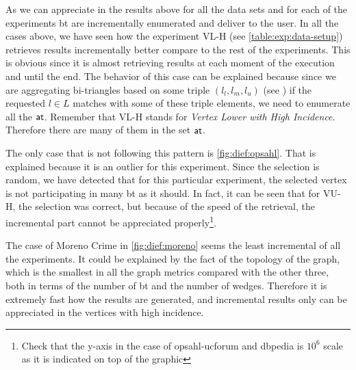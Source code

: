 As we can appreciate in the results above for all the data sets and for each of the experiments \acrshort{bt} are incrementally enumerated and deliver to the user. 
In all the cases above, we have seen how the experiment VL-H (see \autoref{table:exp:data-setup}) retrieves results incrementally better compare to the rest of the experiments. 
This is obvious since it is almost retrieving results at each moment of the execution and until the end. 
The behavior of this case can be explained because since we are aggregating bi-triangles based on some triple $(l_l,l_m,l_u)$ (see ) if the requested $l \in L$ matches with some of these triple elements, 
we need to enumerate all the $\mathsf{at}$. Remember that VL-H stands for \emph{Vertex Lower with High Incidence}. Therefore there are many of them in the set $\mathsf{at}$.

The only case that is not following this pattern is \autoref{fig:dief:opsahl}. That is explained because it is an outlier for this experiment.
Since the selection is random, we have detected that for this particular experiment, the selected vertex is not participating in many \acrshort{bt} as it should.
In fact, it can be seen that for VU-H, the selection was correct, but because of the speed of the retrieval, the incremental part cannot be appreciated properly\footnote{Check that the y-axis in the case of opsahl-ucforum and \acrshort{dbpedia} is $10^6$ scale as it is indicated on top of the graphic}. 

The case of Moreno Crime in \autoref{fig:dief:moreno} seems the least incremental of all the experiments. It could be explained by the fact of the topology of the graph, which is the smallest in all the graph metrics compared with the other three, both in terms of the number of \acrshort{bt} and the number of wedges.
Therefore it is extremely fast how the results are generated, and incremental results only can be appreciated in the vertices with high incidence.

